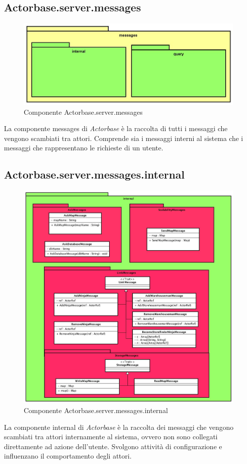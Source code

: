 \documentclass[a4paper]{article}
\begin{document}
	\subsection{Actorbase.server.messages}
		\begin{figure}[H]
			\centering
			\includegraphics[scale=0.5]{Server/messagesLevel.jpg}
			\caption{Componente Actorbase.server.messages}
		\end{figure}
		La componente messages di \emph{Actorbase} è la raccolta di tutti i messaggi che vengono scambiati tra attori. Comprende sia i messaggi interni al sistema che i messaggi che rappresentano le richieste di un utente.
		
	\subsection{Actorbase.server.messages.internal}
		\begin{figure}[H]
			\centering
			\includegraphics[width=\textwidth]{Server/internalLevel.jpg}
			\caption{Componente Actorbase.server.messages.internal}
		\end{figure}
		La componente internal di \emph{Actorbase} è la raccolta dei messaggi che vengono scambiati tra attori internamente al sistema, ovvero non sono collegati direttamente ad azione dell'utente. Svolgono attività di configurazione e influenzano il comportamento degli attori.
		
\end{document}
